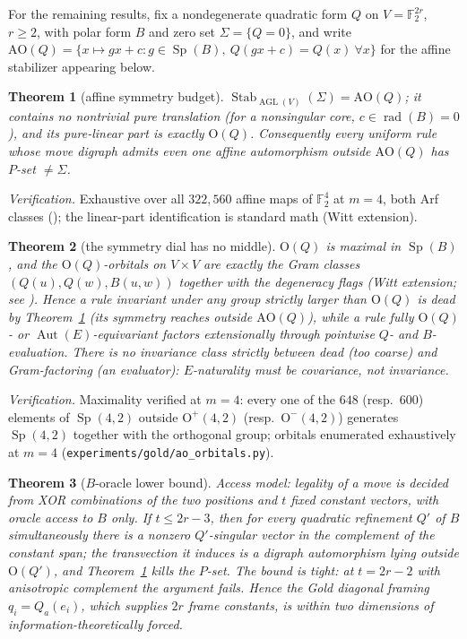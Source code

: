 \documentclass[11pt]{article}
\theoremstyle{plain}
\newtheorem{nogo}{Theorem}
\theoremstyle{definition}
\newcommand{\F}{\mathbb{F}}
\newcommand{\Sp}{\operatorname{Sp}}
\newcommand{\Orth}{\mathrm{O}}
\newcommand{\AO}{\mathrm{AO}}
\newcommand{\AGL}{\operatorname{AGL}}
\newcommand{\Aut}{\operatorname{Aut}}
\newcommand{\rad}{\operatorname{rad}}
\newcommand{\Stab}{\operatorname{Stab}}
\begin{document}
For the remaining results, fix a nondegenerate quadratic form $Q$ on
$V=\F_2^{2r}$, $r\geq2$, with polar form $B$ and zero set
$\Sigma=\{Q=0\}$, and write
$\AO(Q)=\{x\mapsto gx+c: g\in\Sp(B),\ Q(gx+c)=Q(x)\ \forall x\}$ for the
affine stabilizer appearing below.

\begin{nogo}[affine symmetry budget]\label{thm:D}
$\Stab_{\AGL(V)}(\Sigma)=\AO(Q)$; it contains no nontrivial pure
translation (for a nonsingular core, $c\in\rad(B)=0$), and its pure-linear
part is exactly $\Orth(Q)$. Consequently every uniform rule whose move digraph
admits even one affine automorphism outside $\AO(Q)$ has $P$-set
$\neq\Sigma$.
\end{nogo}

\noindent\emph{Verification.} Exhaustive over all $322{,}560$ affine maps
of $\F_2^4$ at $m=4$, both Arf classes
(); the linear-part
identification is standard math (Witt extension).

\begin{nogo}[the symmetry dial has no middle]\label{thm:E}
$\Orth(Q)$ is maximal in $\Sp(B)$, and the $\Orth(Q)$-orbitals on $V\times V$
are exactly the Gram classes $(Q(u),Q(w),B(u,w))$ together with the
degeneracy flags (Witt extension; see \cite[\S8]{EKM08}). Hence a rule
invariant under any group strictly larger than $\Orth(Q)$ is dead by
Theorem~\ref{thm:D} (its symmetry reaches outside $\AO(Q)$), while a rule
fully $\Orth(Q)$- or $\Aut(E)$-equivariant factors extensionally through
pointwise $Q$- and $B$-evaluation. There is no invariance class strictly
between dead (too coarse) and Gram-factoring (an evaluator): $E$-naturality
must be \emph{covariance}, not invariance.
\end{nogo}

\noindent\emph{Verification.} Maximality verified at $m=4$: every one of
the $648$ (resp.\ $600$) elements of $\Sp(4,2)$ outside $\Orth^{+}(4,2)$
(resp.\ $\Orth^{-}(4,2)$) generates $\Sp(4,2)$ together with the orthogonal
group; orbitals enumerated exhaustively at $m=4$
(\texttt{experiments/gold/ao\_orbitals.py}).

\begin{nogo}[$B$-oracle lower bound]\label{thm:F}
Access model: legality of a move is decided from XOR combinations of the
two positions and $t$ fixed constant vectors, with oracle access to $B$
only. If $t\leq 2r-3$, then for \emph{every} quadratic refinement $Q'$ of
$B$ simultaneously there is a nonzero $Q'$-singular vector in the
complement of the constant span; the transvection it induces is a digraph
automorphism lying outside $\Orth(Q')$, and Theorem~\ref{thm:D} kills the
$P$-set. The bound is tight: at $t=2r-2$ with anisotropic complement the
argument fails. Hence the Gold diagonal framing $q_i=Q_a(e_i)$, which
supplies $2r$ frame constants, is within two dimensions of
information-theoretically forced.
\end{nogo}
\end{document}
